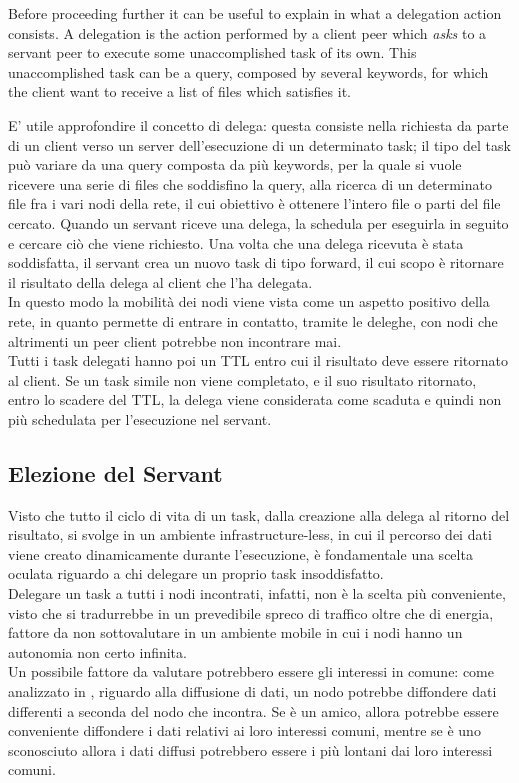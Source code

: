 Before proceeding further it can be useful to explain in what a delegation action consists. A delegation is the action performed by a client peer which \textit{asks} to a servant peer to execute some unaccomplished task of its own. This unaccomplished task can be a query, composed by several keywords, for which the client want to receive a list of files which satisfies it.

E' utile approfondire il concetto di delega: questa consiste nella richiesta da parte di un client verso un server dell'esecuzione di un determinato task; il tipo del task pu\`{o} variare da una query composta da pi\`{u} keywords, per la quale si vuole ricevere una serie di files che soddisfino la query, alla ricerca di un determinato file fra i vari nodi della rete, il cui obiettivo \`{e} ottenere l'intero file o parti del file cercato. Quando un servant riceve una delega, la schedula per eseguirla in seguito e cercare ci\`{o} che viene richiesto. Una volta che una delega ricevuta \`{e} stata soddisfatta, il servant crea un nuovo task di tipo forward, il cui scopo \`{e} ritornare il risultato della delega al client che l'ha delegata. 
\\
In questo modo la mobilità dei nodi viene vista come un aspetto positivo della rete, in quanto permette di entrare in contatto, tramite le deleghe, con nodi che altrimenti un peer client potrebbe non incontrare mai.
\\
Tutti i task delegati hanno poi un TTL entro cui il risultato deve essere ritornato al client. Se un task simile non viene completato, e il suo risultato ritornato, entro lo scadere del TTL, la delega viene considerata come scaduta e quindi non più schedulata per l'esecuzione nel servant.
\\

\subsection{Elezione del Servant}
Visto che tutto il ciclo di vita di un task, dalla creazione alla delega al ritorno del risultato, si svolge in un ambiente infrastructure-less, in cui il percorso dei dati viene creato dinamicamente durante l'esecuzione, è fondamentale una scelta oculata riguardo a chi delegare un proprio task insoddisfatto. 
\\
Delegare un task a tutti i nodi incontrati, infatti, non è la scelta più conveniente, visto che si tradurrebbe in un prevedibile spreco di traffico oltre che di energia, fattore da non sottovalutare in un ambiente mobile in cui i nodi hanno un autonomia non certo infinita.
\\
Un possibile fattore da valutare potrebbero essere gli interessi in comune: come analizzato in \cite{socialNetworks}, riguardo alla diffusione di dati, un nodo potrebbe diffondere dati differenti a seconda del nodo che incontra. Se è un amico, allora potrebbe essere conveniente diffondere i dati relativi ai loro interessi comuni, mentre se è uno sconosciuto allora i dati diffusi potrebbero essere i più lontani dai loro interessi comuni.
\\

